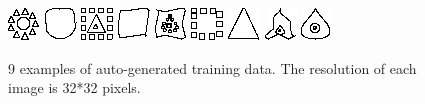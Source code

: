 \begin{figure}
\vspace{.5cm} %
\centering
\includegraphics[width=.1\linewidth]{ext/ex/1.png}
\includegraphics[width=.1\linewidth]{ext/ex/2.png}
\includegraphics[width=.1\linewidth]{ext/ex/3.png}
\includegraphics[width=.1\linewidth]{ext/ex/4.png}
\includegraphics[width=.1\linewidth]{ext/ex/5.png}
\includegraphics[width=.1\linewidth]{ext/ex/6.png}
\includegraphics[width=.1\linewidth]{ext/ex/7.png}
\includegraphics[width=.1\linewidth]{ext/ex/8.png}
\includegraphics[width=.1\linewidth]{ext/ex/9.png}
\caption{9 examples of auto-generated training data. The resolution of each image is 32*32 pixels.}
\label{fig:trainingExamples}
\vspace{.5cm} %
\end{figure}

